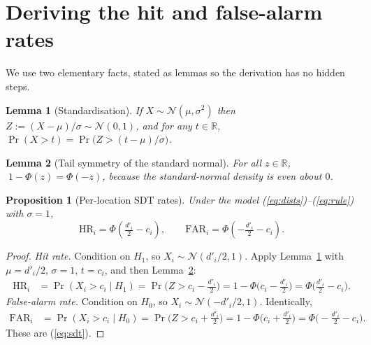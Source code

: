 \documentclass[11pt]{article}
\newtheorem{lemma}{Lemma}
\newtheorem{proposition}{Proposition}
\theoremstyle{remark}
\newcommand{\HR}{\mathrm{HR}}
\newcommand{\FAR}{\mathrm{FAR}}
\newcommand{\dprime}{d'}
\begin{document}
\section{Deriving the hit and false-alarm rates}
\label{sec:derivation}

We use two elementary facts, stated as lemmas so the derivation has no
hidden steps.

\begin{lemma}[Standardisation]
\label{lem:std}
If $X \sim \mathcal{N}(\mu, \sigma^2)$ then $Z := (X-\mu)/\sigma \sim
\mathcal{N}(0,1)$, and for any $t \in \mathbb{R}$,
$\Pr(X > t) = \Pr\!\big(Z > (t-\mu)/\sigma\big)$.
\end{lemma}

\begin{lemma}[Tail symmetry of the standard normal]
\label{lem:sym}
For all $z \in \mathbb{R}$, $\;1 - \Phi(z) = \Phi(-z)$, because the
standard-normal density is even about $0$.
\end{lemma}

\begin{proposition}[Per-location SDT rates]
\label{prop:rates}
Under the model (\ref{eq:dists})--(\ref{eq:rule}) with $\sigma = 1$,
\begin{equation}
  \HR_i = \Phi\!\left(\tfrac{\dprime_i}{2} - c_i\right),
  \qquad
  \FAR_i = \Phi\!\left(-\tfrac{\dprime_i}{2} - c_i\right).
  \label{eq:sdt}
\end{equation}
\end{proposition}

\begin{proof}
\emph{Hit rate.} Condition on $H_1$, so $X_i \sim
\mathcal{N}(\dprime_i/2, 1)$. Apply Lemma~\ref{lem:std} with
$\mu = \dprime_i/2$, $\sigma = 1$, $t = c_i$, and then
Lemma~\ref{lem:sym}:
\begin{align}
  \HR_i
  &= \Pr(X_i > c_i \mid H_1)
   = \Pr\!\big(Z > c_i - \tfrac{\dprime_i}{2}\big)
   = 1 - \Phi\!\big(c_i - \tfrac{\dprime_i}{2}\big)
   = \Phi\!\big(\tfrac{\dprime_i}{2} - c_i\big).
\end{align}
\emph{False-alarm rate.} Condition on $H_0$, so $X_i \sim
\mathcal{N}(-\dprime_i/2, 1)$. Identically,
\begin{align}
  \FAR_i
  &= \Pr(X_i > c_i \mid H_0)
   = \Pr\!\big(Z > c_i + \tfrac{\dprime_i}{2}\big)
   = 1 - \Phi\!\big(c_i + \tfrac{\dprime_i}{2}\big)
   = \Phi\!\big(-\tfrac{\dprime_i}{2} - c_i\big).
\end{align}
These are (\ref{eq:sdt}).
\end{proof}
\end{document}
